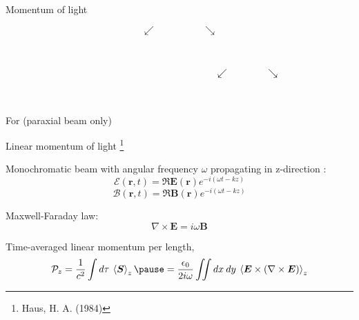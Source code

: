 \documentclass[12pt, dvipsnames]{beamer}
\numberwithin{equation}{section}
\newcommand\blfootnote[1]{%
	\begingroup
	\renewcommand\thefootnote{}\footnote{#1}%
	\addtocounter{footnote}{-1}%
	\endgroup
}
\begin{document}
\begin{frame}{Momentum of light}
	\begin{center}
		\vspace{-4mm}\pause
		$$\swarrow\hspace{2cm}\searrow$$\\\vspace{-4mm}\pause
		\hspace{1cm}\\ \vspace{-8mm}\pause
		$$\hspace{5cm}\swarrow\hspace{1.5cm}\searrow$$\\\vspace{-4mm}\pause
		\hspace{5cm}\hspace{1cm}\\\vspace{1cm}
		\alert{\centering For (paraxial beam only)}
		
	\end{center}
\end{frame}

\begin{frame}{Linear momentum of light}\blfootnote{Haus, H. A. (1984)}
	Monochromatic beam with angular frequency $\omega$ propagating in z-direction :
	$$\boldsymbol{\mathcal{E}}(\boldsymbol{r},t) = \Re{\boldsymbol{E}(\boldsymbol{r}) e^{-i(\omega t-kz )}}$$
	$$\boldsymbol{\mathcal{B}}(\boldsymbol{r},t) = \Re{\boldsymbol{B}(\boldsymbol{r}) e^{-i (\omega t-kz ) }}$$\pause
	
	Maxwell-Faraday law:
	$$\nabla\times\boldsymbol{E}= i\omega \boldsymbol{B} $$\pause
	
	Time-averaged linear momentum per length,
	$$\mathcal{P}_z = \frac{1}{c^2}\int d\tau\: \expval{\boldsymbol{S}}_z\pause
	=\frac{\epsilon_0}{2i\omega}\iint  dx\:dy\: \expval{\boldsymbol{E}\times (\nabla\times\boldsymbol{E})}_z$$
\end{frame}
\end{document}
